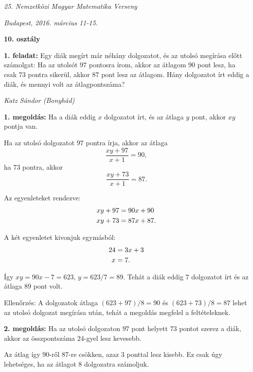 \documentclass[a4paper,10pt]{article}
\newcommand{\ki}[2]{\hfill {\it #1 (#2)}\medskip}
\begin{document}
\begin{center} \Large {\em 25. Nemzetközi Magyar Matematika Verseny} \end{center}
\begin{center} \large{\em Budapest, 2016. március 11-15.} \end{center}
\smallskip
\begin{center} \large{\bf 10. osztály} \end{center}
\bigskip 

{\bf 1. feladat: } Egy diák megírt már néhány dolgozatot, és az utolsó megírása előtt számolgat: Ha az utolsót $97$ pontosra írom, akkor az átlagom $90$ pont lesz, ha csak $73$ pontra sikerül, akkor $87$ pont lesz az átlagom. Hány dolgozatot írt eddig a diák, és mennyi volt az átlagpontszáma?

\ki{Katz Sándor}{Bonyhád}\medskip

{\bf 1. megoldás: } Ha a diák eddig $x$ dolgozatot írt, és az átlaga $y$ pont, akkor $xy$ pontja van. 

\smallskip

\noindent  Ha az utolsó dolgozatot $97$ pontra írja, akkor az átlaga
\[
\frac {xy+97}{x+1} =90,
\]
ha $73$ pontra, akkor
\[
\frac {xy+73}{x+1} =87.
\]

\noindent Az egyenleteket rendezve:
\begin{align} 
 xy+97&=90x+90\notag\\
 xy+73&=87x+87.
\end{align}%

\noindent A két egyenletet kivonjuk egymásból:
\begin{align}
 24&=3x+3\notag\\
 x&=7.
\end{align}%

\noindent Így $xy=90x-7=623$, $y=623/7=89$. Tehát a diák eddig $7$ dolgozatot írt és az átlaga $89$ pont volt. 

\smallskip

\noindent Ellenőrzés: A  dolgozatok átlaga  $(623+97)/8=90$ és $(623+73)/8=87$ lehet az utolsó dolgozat megírása után, tehát a megoldás megfelel a feltételeknek.

\medskip

{\bf 2. megoldás: } Ha az utolsó dolgozaton $97$ pont helyett $73$ pontot szerez a diák, akkor az összpontszáma $24$-gyel lesz kevesebb. 

\smallskip

\noindent Az átlag így $90$-ről $87$-re csökken, azaz $3$ ponttal lesz kisebb. Ez  csak úgy lehetséges, ha az átlagot $8$ dolgozatra számoljuk. 
\end{document}
